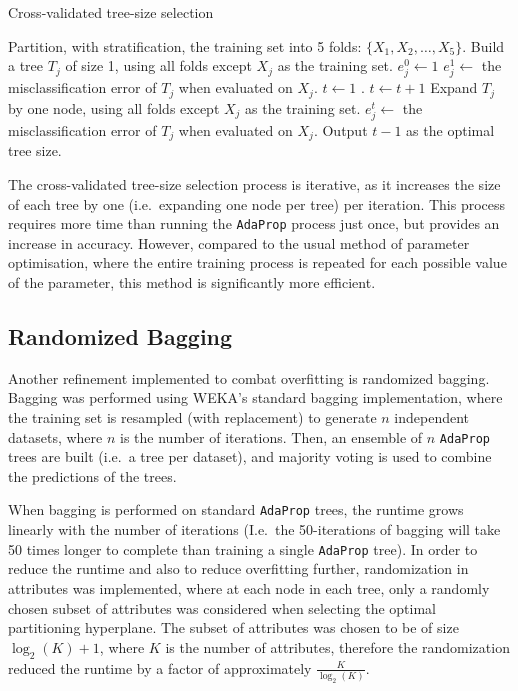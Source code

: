 \documentclass[a4paper,12pt]{report} %
\newcommand{\AdaProp}{\texttt{AdaProp}\xspace}
\begin{document}
\begin{algorithm}
\caption{Cross-validated tree-size selection}
\label{algoCVTSS} 
    \begin{algorithmic}
    \State Partition, with stratification, the training set into 5 folds: 
        $\{ X_1, X_2, \ldots, X_5 \}$.
        \State Build a tree $T_j$ of size 1, using all folds except $X_j$ as the training set.
        \State $e^0_j \gets 1$ 
        \State $e^1_j \gets$ the misclassification error of $T_j$ when evaluated on $X_j$.        
    \EndFor    
    \State $t \gets 1$ .    
        \State $t \gets t+1$
            \State Expand $T_j$ by one node, 
                using all folds except $X_j$ as the training set.
            \State $e^t_j \gets$ the misclassification error of $T_j$ when evaluated on $X_j$.
        \EndFor
    \EndWhile
    \State Output $t-1$ as the optimal tree size.
    \end{algorithmic}
\end{algorithm}

The cross-validated tree-size selection process is 
    iterative, as it increases the size of each tree by
    one (i.e.\ expanding one node per tree) per iteration.    
This process requires more time than running 
    the \AdaProp process just once, 
    but provides an increase in accuracy.
However, compared to the usual method of parameter optimisation, 
    where the entire training process is repeated for each possible 
    value of the parameter, this method is significantly more efficient.


\subsection{Randomized Bagging}

Another refinement implemented to combat overfitting is 
    randomized bagging.
Bagging was performed using WEKA's standard bagging implementation, 
    where the training set is resampled (with replacement) to generate
    $n$ independent datasets, where $n$ is the number of iterations.
Then, an ensemble of $n$ \AdaProp trees are built (i.e.\ a tree per dataset), 
    and majority voting is used to combine the predictions of the trees.

When bagging is performed on standard \AdaProp trees, 
    the runtime grows linearly with the number of iterations
    (I.e.\ the 50-iterations of bagging will take 50 times longer
    to complete than training a single \AdaProp tree).
In order to reduce the runtime and also to reduce overfitting further, 
    randomization in attributes was implemented, 
    where at each node in each tree, only a randomly chosen subset of attributes 
    was considered when selecting the optimal partitioning hyperplane.
The subset of attributes was chosen to be of size $\log_2(K)+1$, 
    where $K$ is the number of attributes, 
    therefore the randomization reduced the runtime by a factor 
    of approximately $\frac{K}{\log_2(K)}$.
\end{document}
